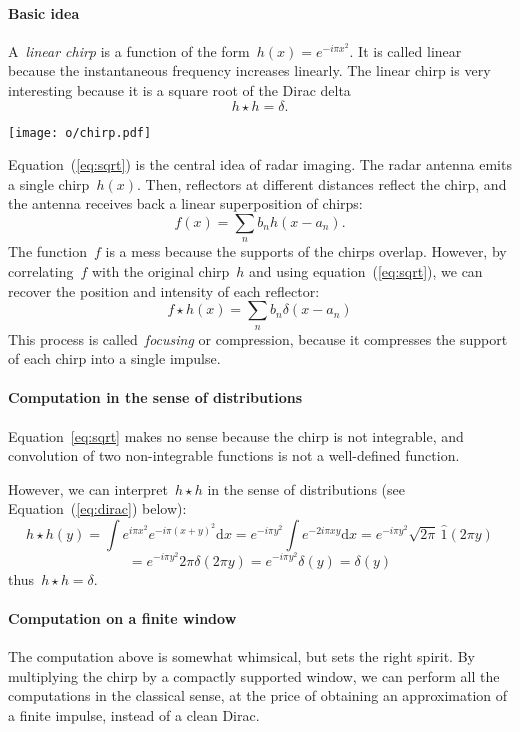 \documentclass[a4paper]{article}      %
\newcommand{\1}{\mathbf{1}}
\newcommand{\ud}{\mathrm{d}}
\newcommand{\paren}[1]{\left(#1\right)}
\begin{document}
\paragraph{Basic idea}
A~\emph{linear chirp} is a function of the form~$h(x)=e^{-i\pi x^2}$.  It is
called linear because the instantaneous frequency increases linearly.
The linear chirp is very interesting because it is a square root of
the Dirac delta
\begin{equation}
	h\star h=\delta.
	\label{eq:sqrt}
\end{equation}

\texttt{[image: o/chirp.pdf]}

Equation~(\ref{eq:sqrt}) is the central idea of radar imaging.  The radar antenna
emits a single chirp~$h(x)$.  Then, reflectors at different distances reflect
the chirp, and the antenna receives back a linear superposition of chirps:
$$
f(x)=\sum_n b_n h(x-a_n).
$$
The function~$f$ is a mess because the supports of the chirps overlap.
However, by correlating~$f$ with the original chirp~$h$ and
using equation~(\ref{eq:sqrt}), we can recover the position and intensity of
each reflector:
$$
f\star h (x) = \sum_n b_n \delta(x - a_n)
$$
This process is called~\emph{focusing} or compression, because it
compresses the support of each chirp into a single impulse.

\paragraph{Computation in the sense of distributions}
Equation~\ref{eq:sqrt} makes no sense because the chirp is not integrable,
and convolution of two non-integrable functions is not a well-defined
function.

However, we can interpret~$h\star h$ in the sense of distributions (see
Equation~(\ref{eq:dirac}) below):
$$
h\star h (y)
=
\int e^{i\pi x^2}e^{-i\pi(x+y)^2}\ud x
=
e^{-i\pi y^2}
\int e^{-2i\pi xy}
\ud x
=
e^{-i\pi y^2}\sqrt{2\pi}\, \widehat{1}\paren{2\pi y}
$$
$$
=
e^{-i\pi y^2}2\pi\delta\paren{2\pi y}
=
e^{-i\pi y^2}\delta(y)
=\delta(y)
$$
thus~$h\star h=\delta$.


\paragraph{Computation on a finite window}
The computation above is somewhat whimsical, but sets the right spirit.  By
multiplying the chirp by a compactly supported window, we can perform all the
computations in the classical sense,  at the price of obtaining an
approximation of a finite impulse, instead of a clean Dirac.
\end{document}
